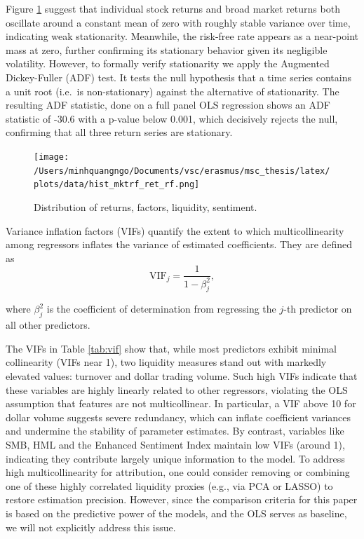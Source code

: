  Figure \ref{fig:his_mktrf_ret_rf} suggest that individual stock returns and broad market returns both oscillate around a constant mean of zero with roughly stable variance over time, indicating weak stationarity. Meanwhile, the risk-free rate appears as a near-point mass at zero, further confirming its stationary behavior given its negligible volatility. However, to formally verify stationarity we apply the Augmented Dickey-Fuller (ADF) test. It tests the null hypothesis that a time series contains a unit root (i.e.\ is non-stationary) against the alternative of stationarity. The resulting ADF statistic, done on a full panel OLS regression shows an ADF statistic of -30.6 with a p-value below 0.001, which decisively rejects the null, confirming that all three return series are stationary.


\begin{figure}[H]
     \centering
     \texttt{[image: /Users/minhquangngo/Documents/vsc/erasmus/msc\_thesis/latex/plots/data/hist\_mktrf\_ret\_rf.png]}
     \caption{Distribution of returns, factors, liquidity, sentiment.}
     \label{fig:his_mktrf_ret_rf}
 \end{figure}

 Variance inflation factors (VIFs) quantify the extent to which multicollinearity among regressors inflates the variance of estimated coefficients. They are defined as
 \begin{equation}
 \label{eq:vif}
\mathrm{VIF}_j = \frac{1}{1 - \beta_j^2},
\end{equation}

where $\beta_j^2$ is the coefficient of determination from regressing the $j$-th predictor on all other predictors.

 The VIFs in Table \ref{tab:vif} show that, while most predictors exhibit minimal collinearity (VIFs near 1), two liquidity measures stand out with markedly elevated values: turnover and dollar trading volume. Such high VIFs indicate that these variables are highly linearly related to other regressors, violating the OLS assumption that features are not multicollinear. In particular, a VIF above 10 for dollar volume suggests severe redundancy, which can inflate coefficient variances and undermine the stability of parameter estimates. By contrast, variables like SMB, HML and the Enhanced Sentiment Index maintain low VIFs (around 1), indicating they contribute largely unique information to the model. To address high multicollinearity for attribution, one could consider removing or combining one of these highly correlated liquidity proxies (e.g., via PCA or LASSO) to restore estimation precision. However, since the comparison criteria for this paper is based on the predictive power of the models, and the OLS serves as baseline, we will not explicitly address this issue.


